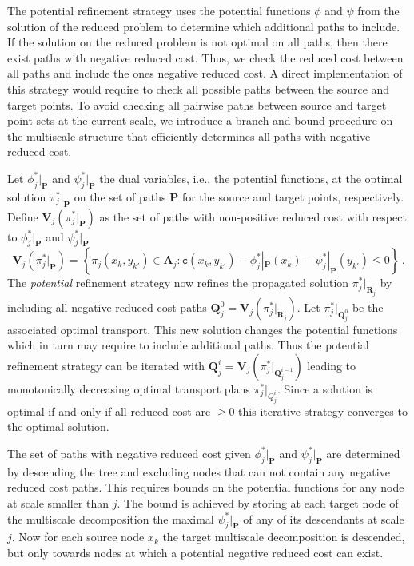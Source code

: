 \documentclass[twoside,11pt]{article}
\newcommand{\cost}[0]{\mathtt{c}}
\newcommand{\coupling}[0]{\pi}
\begin{document}
The potential refinement strategy uses the potential functions $\phi$ and
$\psi$ from the solution of the reduced problem to determine which additional
paths to include. If the solution on the reduced problem is not optimal on all
paths, then there exist paths with negative reduced cost. Thus, we check the
reduced cost between all paths and include the ones negative reduced cost.  A
direct implementation of this strategy would require to check all possible
paths between the source and target points. To avoid checking all pairwise
paths between source and target point sets at the current scale, we introduce a
branch and bound procedure on the multiscale structure that efficiently
determines all paths with negative reduced cost. 

Let $ \phi_j^* |_\mathbf{P}$ and $ \psi_j^*|_\mathbf{P}$ the dual variables,
i.e., the potential functions, at the optimal solution
$\coupling_j^*|_\mathbf{P}$ on the set of paths $\mathbf{P}$ for the source and
target points, respectively. Define $\mathbf{V}_j( \coupling_j^*|_\mathbf{P} )$
as the set of paths with non-positive reduced cost with respect to $ \phi_j^*
|_\mathbf{P}$ and $\psi_j^* |_\mathbf{P}$
$$
\mathbf{V}_j( \coupling_j^* |_\mathbf{P}) = \left \{ \coupling_j(x_k, y_{k'})
\in \mathbf{A}_j : \cost(x_k, y_{k'}) -  \phi_j^* |_\mathbf{P}(x_k) - \psi_j^*
|_{\mathbf{P}}(y_{k'}) \le 0 \right \} \, .
$$
The {\em potential} refinement strategy now refines the propagated solution
$\coupling_j^*|_{\mathbf{R}_j}$ by including all negative reduced cost paths
$\mathbf{Q}_j^0 = \mathbf{V}_j( \coupling_j^* |_{\mathbf{R}_j})$.
Let $\coupling_j^*|_{\mathbf{Q}_j^0}$ be the associated optimal transport. This
new solution changes the potential functions which in turn may require to
include additional paths. Thus the potential refinement strategy can be
iterated with $\mathbf{Q}_j^i = \mathbf{V}_j(
\coupling_j^*|_{\mathbf{Q}_j^{i-1}})$ leading to monotonically decreasing
optimal transport plans $\coupling_j^*|_{Q_j^i}$. Since a solution is optimal
if and only if all reduced cost are $\ge 0$ this iterative strategy converges
to the optimal solution.  

The set of paths with negative reduced cost given $ \phi_j^*|_\mathbf{P}$ and $
\psi_j^* |_\mathbf{P}$ are determined by descending the tree and excluding
nodes that can not contain any negative reduced cost paths. This requires
bounds on the potential functions for any node at scale smaller than $j$. The
bound is achieved by storing at each target node of the multiscale
decomposition the maximal $  \psi_j^* |_\mathbf{P}$ of any of its descendants
at scale $j$. Now for each source node $x_k$ the target multiscale
decomposition is descended, but only towards nodes at which a potential
negative reduced cost can exist.
\end{document}
